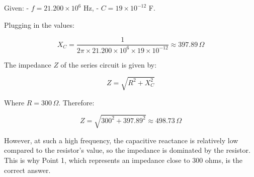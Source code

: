 Given:
- \( f = 21.200 \times 10^6 \) Hz,
- \( C = 19 \times 10^{-12} \) F.

Plugging in the values:

\[
X_C = \frac{1}{2 \pi \times 21.200 \times 10^6 \times 19 \times 10^{-12}} \approx 397.89 \, \Omega
\]

The impedance \( Z \) of the series circuit is given by:

\[
Z = \sqrt{R^2 + X_C^2}
\]

Where \( R = 300 \, \Omega \). Therefore:

\[
Z = \sqrt{300^2 + 397.89^2} \approx 498.73 \, \Omega
\]

However, at such a high frequency, the capacitive reactance is relatively low compared to the resistor's value, so the impedance is dominated by the resistor. This is why Point 1, which represents an impedance close to 300 ohms, is the correct answer.

